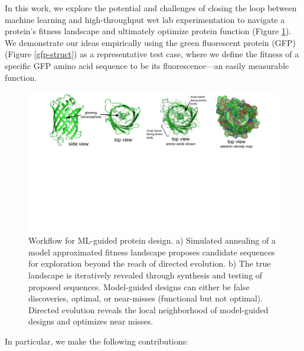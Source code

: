 In this work, we explore the potential and challenges of closing the loop between machine learning and high-throughput wet lab experimentation to navigate a protein’s fitness landscape and ultimately optimize protein function (Figure \ref{workflow}). We demonstrate our ideas empirically using the green fluorescent protein (GFP) (Figure \ref{gfp-struct}) as a representative test case, where we define the fitness of a specific GFP amino acid sequence to be its fluorescence---an easily measurable function.

\begin{figure}[t!]
  \includegraphics[width=1\linewidth,page=2,trim={2cm 7cm 2cm 0}]{figures/2018-05-09-NIPS_2018_Figures.pdf}
  \caption{\small{
    Workflow for ML-guided protein design. a) Simulated annealing of a model approximated fitness landscape proposes candidate sequences for exploration beyond the reach of directed evolution. b) The true landscape is iteratively revealed through synthesis and testing of proposed sequences. Model-guided designs can either be false discoveries, optimal, or near-misses (functional but not optimal). Directed evolution reveals the local neighborhood of model-guided designs and optimizes near misses.}
  }
  \label{workflow}
\end{figure}

In particular, we make the following contributions:

